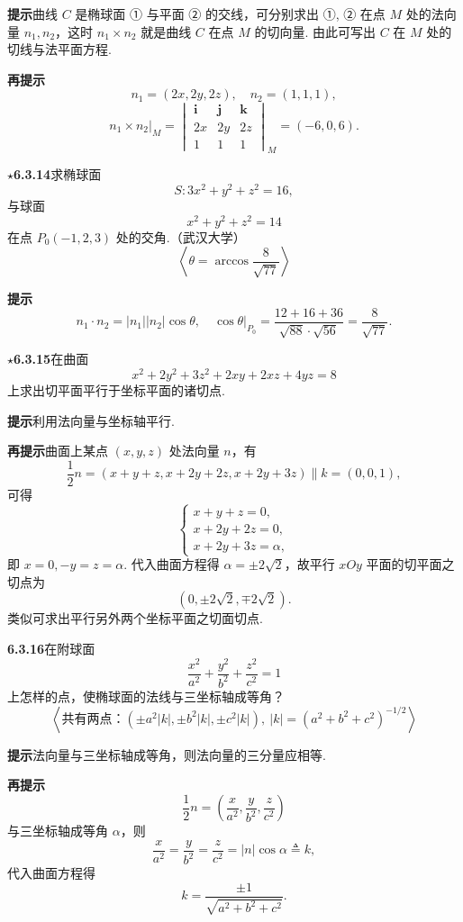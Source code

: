 \documentclass[UTF8, 12pt, fontset=fandol, oneside]{ctexart}
\begin{document}
\noindent\textbf{提示}\quad 曲线 $C$ 是椭球面 ① 与平面 ② 的交线，可分别求出 ①, ② 在点 $M$ 处的法向量 $n_1,n_2$，这时 $n_1\times n_2$ 就是曲线 $C$ 在点 $M$ 的切向量. 由此可写出 $C$ 在 $M$ 处的切线与法平面方程.

\noindent\textbf{再提示}\quad
\[
  n_1=(2x,2y,2z),\quad n_2=(1,1,1),
\]
\[
  n_1\times n_2\big|_M=
  \begin{vmatrix}
    \mathbf{i}&\mathbf{j}&\mathbf{k}\\
    2x&2y&2z\\
    1&1&1
  \end{vmatrix}_M
  =(-6,0,6).
\]

\noindent\textbf{\ensuremath{\star}6.3.14}\quad 求椭球面
\[
  S:3x^2+y^2+z^2=16, \tag{1}
\]
与球面
\[
  x^2+y^2+z^2=14 \tag{2}
\]
在点 $P_0(-1,2,3)$ 处的交角.（武汉大学）
\[
  \left\langle \theta=\arccos\frac{8}{\sqrt{77}}\right\rangle
\]

\noindent\textbf{提示}\quad
\[
  n_1\cdot n_2=|n_1||n_2|\cos\theta,\quad
  \cos\theta\big|_{P_0}=
  \frac{12+16+36}{\sqrt{88}\cdot\sqrt{56}}
  =\frac8{\sqrt{77}}.
\]

\noindent\textbf{\ensuremath{\star}6.3.15}\quad 在曲面
\[
  x^2+2y^2+3z^2+2xy+2xz+4yz=8
\]
上求出切平面平行于坐标平面的诸切点.

\noindent\textbf{提示}\quad 利用法向量与坐标轴平行.

\noindent\textbf{再提示}\quad 曲面上某点 $(x,y,z)$ 处法向量 $n$，有
\[
  \frac12n=(x+y+z,x+2y+2z,x+2y+3z)\parallel k=(0,0,1),
\]
可得
\[
  \begin{cases}
    x+y+z=0,\\
    x+2y+2z=0,\\
    x+2y+3z=\alpha,
  \end{cases}
\]
即 $x=0,-y=z=\alpha$. 代入曲面方程得 $\alpha=\pm2\sqrt2$，故平行 $xOy$ 平面的切平面之切点为
\[
  (0,\pm2\sqrt2,\mp2\sqrt2).
\]
类似可求出平行另外两个坐标平面之切面切点.

\noindent\textbf{6.3.16}\quad 在附球面
\[
  \frac{x^2}{a^2}+\frac{y^2}{b^2}+\frac{z^2}{c^2}=1
\]
上怎样的点，使椭球面的法线与三坐标轴成等角？
\[
  \left\langle
  \text{共有两点：}(\pm a^2|k|,\pm b^2|k|,\pm c^2|k|),
  \ |k|=(a^2+b^2+c^2)^{-1/2}
  \right\rangle
\]

\noindent\textbf{提示}\quad 法向量与三坐标轴成等角，则法向量的三分量应相等.

\noindent\textbf{再提示}\quad
\[
  \frac12n=\left(\frac{x}{a^2},\frac{y}{b^2},\frac{z}{c^2}\right)
\]
与三坐标轴成等角 $\alpha$，则
\[
  \frac{x}{a^2}=\frac{y}{b^2}=\frac{z}{c^2}=|n|\cos\alpha\triangleq k,
\]
代入曲面方程得
\[
  k=\frac{\pm1}{\sqrt{a^2+b^2+c^2}}.
\]
\end{document}
